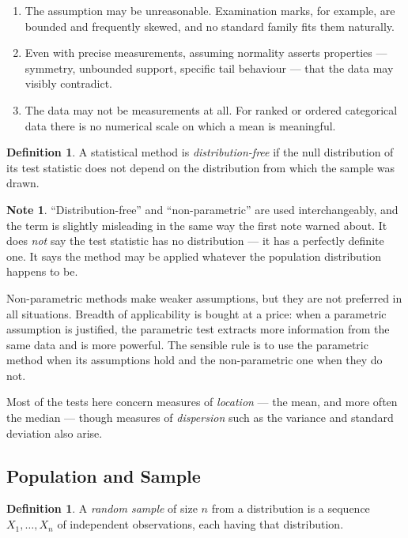 \documentclass[11pt,a4paper]{article}
\theoremstyle{definition}
\newtheorem{definition}[thm]{Definition}
\newtheorem{note}[thm]{Note}
\begin{document}
\begin{enumerate}
\item[(i).] The assumption may be unreasonable. Examination marks, for example,
are bounded and frequently skewed, and no standard family fits them naturally.
\item[(ii).] Even with precise measurements, assuming normality asserts properties
--- symmetry, unbounded support, specific tail behaviour --- that the data may
visibly contradict.
\item[(iii).] The data may not be measurements at all. For ranked or ordered
categorical data there is no numerical scale on which a mean is meaningful.
\end{enumerate}

\begin{definition}
A statistical method is \emph{distribution-free} if the null distribution of its
test statistic does not depend on the distribution from which the sample was
drawn.
\end{definition}

\begin{note}
``Distribution-free'' and ``non-parametric'' are used interchangeably, and the term
is slightly misleading in the same way the first note warned about. It does
\emph{not} say the test statistic has no distribution --- it has a perfectly
definite one. It says the method may be applied whatever the population
distribution happens to be.
\end{note}

Non-parametric methods make weaker assumptions, but they are not preferred in all
situations. Breadth of applicability is bought at a price: when a parametric
assumption is justified, the parametric test extracts more information from the
same data and is more powerful. The sensible rule is to use the parametric method
when its assumptions hold and the non-parametric one when they do not.

Most of the tests here concern measures of \emph{location} --- the mean, and more
often the median --- though measures of \emph{dispersion} such as the variance and
standard deviation also arise.

\subsection{Population and Sample}

\begin{definition}
A \emph{random sample} of size $n$ from a distribution is a sequence
$X_1, \ldots, X_n$ of independent observations, each having that distribution.
\end{definition}
\end{document}
